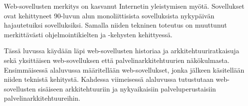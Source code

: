 Web-sovellusten merkitys on kasvanut Internetin yleistymisen myötä. Sovellukset ovat kehittyneet 90-luvun alun monoliittisista sovelluksista nykypäivän hajautetuiksi sovelluksiksi. Samalla niiden tekninen toteutus on muuttunut merkittävästi ohjelmointikielten ja -kehysten kehittyessä.

Tässä luvussa käydään läpi web-sovellusten historiaa ja arkkitehtuuriratkaisuja sekä yksittäisen web-sovelluksen että palvelinarkkitehtuurien näkökulmasta. Ensimmäisessä alaluvussa määritellään web-sovellukset, jonka jälkeen käsitellään niiden teknistä kehitystä. Kahdessa viimeisessä alaluvussa tutustutaan web-sovellusten si\-säi\-seen arkkitehtuuriin ja nykyaikaisiin palveluperustaisiin palvelinarkkitehtuureihin.